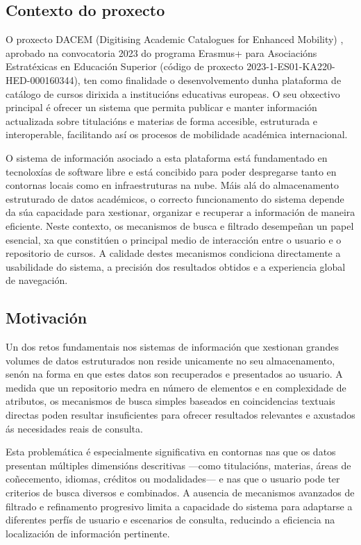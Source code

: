 \documentclass[%
    a4paper,               %
    twoside,                %
    parskip=full,           %
    10pt,                   %
    titlepage=on,           %
    captions=tableabove,    %
]{article}                  %
\begin{document}
\subsection{Contexto do proxecto}
O proxecto DACEM (Digitising Academic Catalogues for Enhanced Mobility) \cite{dacem}, aprobado na convocatoria 2023 do programa Erasmus+ para Asociacións Estratéxicas en Educación Superior (código de proxecto 2023-1-ES01-KA220-HED-000160344), ten como finalidade o desenvolvemento dunha plataforma de catálogo de cursos dirixida a institucións educativas europeas. O seu obxectivo principal é ofrecer un sistema que permita publicar e manter información actualizada sobre titulacións e materias de forma accesible, estruturada e interoperable, facilitando así os procesos de mobilidade académica internacional.

O sistema de información asociado a esta plataforma está fundamentado en tecnoloxías de software libre e está concibido para poder despregarse tanto en contornas locais como en infraestruturas na nube. Máis alá do almacenamento estruturado de datos académicos, o correcto funcionamento do sistema depende da súa capacidade para xestionar, organizar e recuperar a información de maneira eficiente. Neste contexto, os mecanismos de busca e filtrado desempeñan un papel esencial, xa que constitúen o principal medio de interacción entre o usuario e o repositorio de cursos. A calidade destes mecanismos condiciona directamente a usabilidade do sistema, a precisión dos resultados obtidos e a experiencia global de navegación.

\subsection{Motivación}
Un dos retos fundamentais nos sistemas de información que xestionan grandes volumes de datos estruturados non reside unicamente no seu almacenamento, senón na forma en que estes datos son recuperados e presentados ao usuario. A medida que un repositorio medra en número de elementos e en complexidade de atributos, os mecanismos de busca simples baseados en coincidencias textuais directas poden resultar insuficientes para ofrecer resultados relevantes e axustados ás necesidades reais de consulta.

Esta problemática é especialmente significativa en contornas nas que os datos presentan múltiples dimensións descritivas —como titulacións, materias, áreas de coñecemento, idiomas, créditos ou modalidades— e nas que o usuario pode ter criterios de busca diversos e combinados. A ausencia de mecanismos avanzados de filtrado e refinamento progresivo limita a capacidade do sistema para adaptarse a diferentes perfís de usuario e escenarios de consulta, reducindo a eficiencia na localización de información pertinente.
\end{document}
